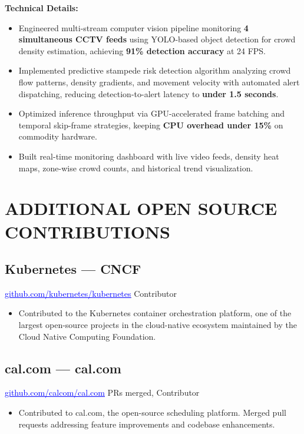 \documentclass[letterpaper,10pt]{article}
\begin{document}
\vspace{4pt}
\noindent\textbf{Technical Details:}
\begin{itemize}
  \item Engineered multi-stream computer vision pipeline monitoring \textbf{4 simultaneous CCTV feeds} using YOLO-based object detection for crowd density estimation, achieving \textbf{91\% detection accuracy} at 24 FPS.
  \item Implemented predictive stampede risk detection algorithm analyzing crowd flow patterns, density gradients, and movement velocity with automated alert dispatching, reducing detection-to-alert latency to \textbf{under 1.5 seconds}.
  \item Optimized inference throughput via GPU-accelerated frame batching and temporal skip-frame strategies, keeping \textbf{CPU overhead under 15\%} on commodity hardware.
  \item Built real-time monitoring dashboard with live video feeds, density heat maps, zone-wise crowd counts, and historical trend visualization.
\end{itemize}


\section{ADDITIONAL OPEN SOURCE CONTRIBUTIONS}

\vspace{2pt}
\subsection{Kubernetes — CNCF}
\noindent
\href{https://github.com/kubernetes/kubernetes}{\textcolor{blue}{\underline{github.com/kubernetes/kubernetes}}} \hfill Contributor
\begin{itemize}
  \item Contributed to the Kubernetes container orchestration platform, one of the largest open-source projects in the cloud-native ecosystem maintained by the Cloud Native Computing Foundation.
\end{itemize}

\vspace{2pt}
\subsection{cal.com — cal.com}
\noindent
\href{https://github.com/calcom/cal.com}{\textcolor{blue}{\underline{github.com/calcom/cal.com}}} \hfill PRs merged, Contributor
\begin{itemize}
  \item Contributed to cal.com, the open-source scheduling platform. Merged pull requests addressing feature improvements and codebase enhancements.
\end{itemize}
\end{document}
